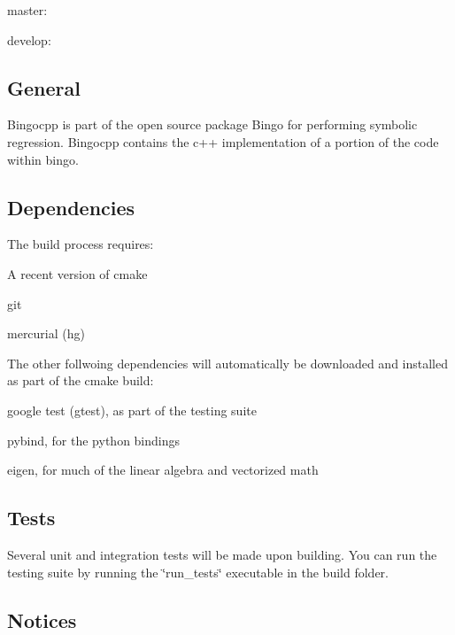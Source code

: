 master\+: \href{https://travis-ci.com/nasa/bingocpp}{\tt } \href{https://coveralls.io/github/nasa/bingocpp?branch=master}{\tt }

develop\+: \href{https://travis-ci.com/nasa/bingocpp}{\tt } \href{https://coveralls.io/github/nasa/bingocpp?branch=develop}{\tt } \href{https://www.codacy.com/app/bingo_developers/bingocpp?utm_source=github.com&amp;utm_medium=referral&amp;utm_content=nasa/bingocpp&amp;utm_campaign=Badge_Grade}{\tt }

\subsection*{General}

Bingocpp is part of the open source package Bingo for performing symbolic regression. Bingocpp contains the c++ implementation of a portion of the code within bingo.

\subsection*{Dependencies}

The build process requires\+:
\begin{DoxyItemize}
\item A recent version of cmake
\item git
\item mercurial (hg)
\end{DoxyItemize}

The other follwoing dependencies will automatically be downloaded and installed as part of the cmake build\+:
\begin{DoxyItemize}
\item google test (gtest), as part of the testing suite
\item pybind, for the python bindings
\item eigen, for much of the linear algebra and vectorized math
\end{DoxyItemize}

\subsection*{Tests}

Several unit and integration tests will be made upon building. You can run the testing suite by running the \char`\"{}run\+\_\+tests\char`\"{} executable in the build folder.

\subsection*{Notices}

